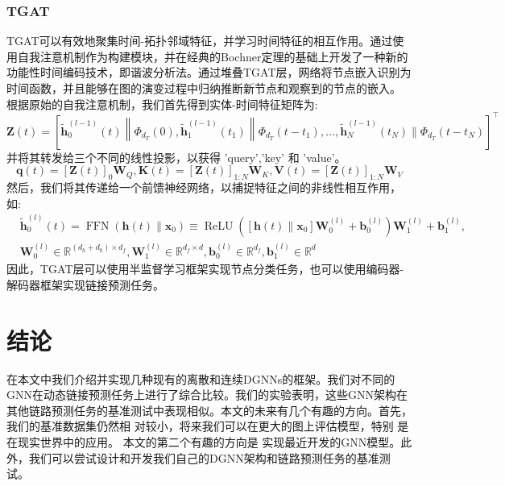 \documentclass[conference]{IEEEtran}
\begin{document}
\subsubsection{TGAT}
TGAT可以有效地聚集时间-拓扑邻域特征，并学习时间特征的相互作用。通过使用自我注意机制作为构建模块，并在经典的Bochner定理的基础上开发了一种新的功能性时间编码技术，即谐波分析法。通过堆叠TGAT层，网络将节点嵌入识别为时间函数，并且能够在图的演变过程中归纳推断新节点和观察到的节点的嵌入。
根据原始的自我注意机制，我们首先得到实体-时间特征矩阵为:
\begin{equation}
	\mathbf{Z}(t)=\left[\tilde{\mathbf{h}}_{0}^{(l-1)}(t)\left\|\Phi_{d_{T}}(0), \tilde{\mathbf{h}}_{1}^{(l-1)}\left(t_{1}\right)\right\| \Phi_{d_{T}}\left(t-t_{1}\right), \ldots, \tilde{\mathbf{h}}_{N}^{(l-1)}\left(t_{N}\right) \| \Phi_{d_{T}}\left(t-t_{N}\right)\right]^{\top}
\end{equation}
并将其转发给三个不同的线性投影，以获得 'query','key' 和 'value'。
\begin{equation}
	\mathbf{q}(t)=[\mathbf{Z}(t)]_{0} \mathbf{W}_{Q}, \mathbf{K}(t)=[\mathbf{Z}(t)]_{1: N} \mathbf{W}_{K}, \mathbf{V}(t)=[\mathbf{Z}(t)]_{1: N} \mathbf{W}_{V}
\end{equation}
然后，我们将其传递给一个前馈神经网络，以捕捉特征之间的非线性相互作用，如:
\begin{equation}
	\begin{aligned}
	&\tilde{\mathbf{h}}_{0}^{(l)}(t)=\operatorname{FFN}\left(\mathbf{h}(t) \| \mathbf{x}_{0}\right) \equiv \operatorname{ReLU}\left(\left[\mathbf{h}(t) \| \mathbf{x}_{0}\right] \mathbf{W}_{0}^{(l)}+\mathbf{b}_{0}^{(l)}\right) \mathbf{W}_{1}^{(l)}+\mathbf{b}_{1}^{(l)}, \\
	&\mathbf{W}_{0}^{(l)} \in \mathbb{R}^{\left(d_{h}+d_{0}\right) \times d_{f}}, \mathbf{W}_{1}^{(l)} \in \mathbb{R}^{d_{f} \times d}, \mathbf{b}_{0}^{(l)} \in \mathbb{R}^{d_{f}}, \mathbf{b}_{1}^{(l)} \in \mathbb{R}^{d}
\end{aligned}
\end{equation}
因此，TGAT层可以使用半监督学习框架实现节点分类任务，也可以使用编码器-解码器框架实现链接预测任务。


\section{结论}
在本文中我们介绍并实现几种现有的离散和连续DGNNs的框架。我们对不同的GNN在动态链接预测任务上进行了综合比较。我们的实验表明，这些GNN架构在 其他链路预测任务的基准测试中表现相似。本文的未来有几个有趣的方向。首先，我们的基准数据集仍然相 对较小，将来我们可以在更大的图上评估模型，特别 是在现实世界中的应用。
本文的第二个有趣的方向是 实现最近开发的GNN模型。此外，我们可以尝试设计和开发我们自己的DGNN架构和链路预测任务的基准测试。	
\end{document}
